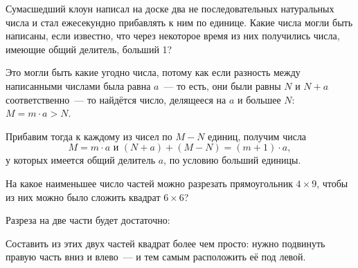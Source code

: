

\begin{itemize}
	\itC Сумасшедший клоун написал на доске два не последовательных натуральных числа и стал ежесекундно прибавлять к ним по единице. Какие числа могли быть написаны, если известно, что через некоторое время из них получились числа, имеющие общий делитель, больший 1?
	
	\itr Это могли быть какие угодно числа, потому как если разность между написанными числами была равна $a$~— то есть, они были равны $N$ и $N+a$ соответственно~— то найдётся число, делящееся на $a$ и большее $N$: $M= m \cdot a > N$.
	
	Прибавим тогда к каждому из чисел по $M - N$ единиц, получим числа
	$$M = m \cdot a\text{\ \ и\ \ }(N+a) + (M-N) = (m+1) \cdot a,$$
	у которых имеется общий делитель $a$, по условию больший единицы.
\end{itemize}


\begin{itemize}

	\itB На какое наименьшее число частей можно разрезать прямоугольник $4\times 9$, чтобы из них можно было сложить квадрат $6\times 6$? 

	\itr Разреза на две части будет достаточно:
	
	\begin{center}  \end{center}
	
	Составить из этих двух частей квадрат более чем просто: нужно подвинуть правую часть вниз и влево~— и тем самым расположить её под левой.

\end{itemize}


